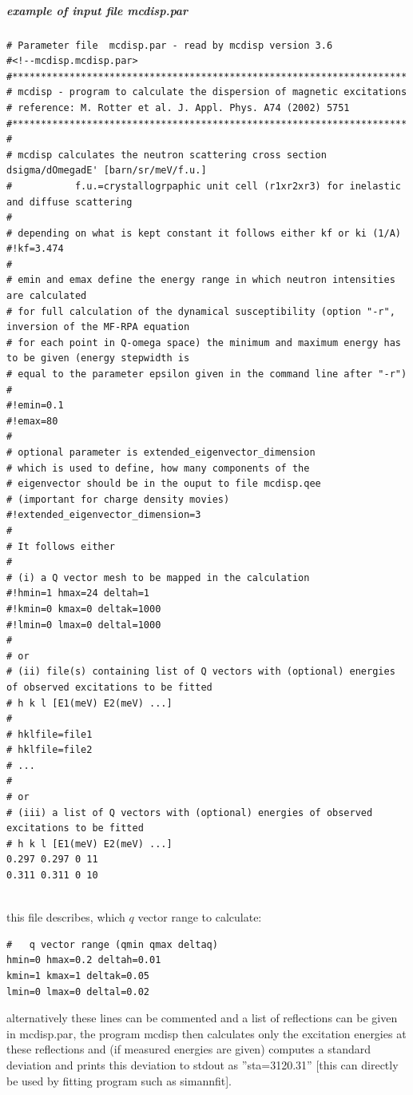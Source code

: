 \subparagraph{example of input file {\prg mcdisp.par}}

{\footnotesize
\begin{verbatim}
# Parameter file  mcdisp.par - read by mcdisp version 3.6
#<!--mcdisp.mcdisp.par>
#*********************************************************************
# mcdisp - program to calculate the dispersion of magnetic excitations
# reference: M. Rotter et al. J. Appl. Phys. A74 (2002) 5751
#*********************************************************************
#
# mcdisp calculates the neutron scattering cross section dsigma/dOmegadE' [barn/sr/meV/f.u.]
#           f.u.=crystallogrpaphic unit cell (r1xr2xr3) for inelastic and diffuse scattering
#
# depending on what is kept constant it follows either kf or ki (1/A)
#!kf=3.474
# 
# emin and emax define the energy range in which neutron intensities are calculated
# for full calculation of the dynamical susceptibility (option "-r", inversion of the MF-RPA equation 
# for each point in Q-omega space) the minimum and maximum energy has to be given (energy stepwidth is 
# equal to the parameter epsilon given in the command line after "-r")
#
#!emin=0.1
#!emax=80
#
# optional parameter is extended_eigenvector_dimension
# which is used to define, how many components of the
# eigenvector should be in the ouput to file mcdisp.qee
# (important for charge density movies)
#!extended_eigenvector_dimension=3
#
# It follows either 
#
# (i) a Q vector mesh to be mapped in the calculation
#!hmin=1 hmax=24 deltah=1
#!kmin=0 kmax=0 deltak=1000
#!lmin=0 lmax=0 deltal=1000
#
# or 
# (ii) file(s) containing list of Q vectors with (optional) energies of observed excitations to be fitted
# h k l [E1(meV) E2(meV) ...]
#
# hklfile=file1
# hklfile=file2
# ...
#
# or
# (iii) a list of Q vectors with (optional) energies of observed excitations to be fitted
# h k l [E1(meV) E2(meV) ...]
0.297 0.297 0 11 
0.311 0.311 0 10 


\end{verbatim}
}

this file describes, which $q$ vector range to
calculate:

\begin{verbatim}
#   q vector range (qmin qmax deltaq)
hmin=0 hmax=0.2 deltah=0.01
kmin=1 kmax=1 deltak=0.05
lmin=0 lmax=0 deltal=0.02
\end{verbatim}

alternatively these lines can be commented and a
list of reflections can be given in {\prg mcdisp.par}, the
program {\prg mcdisp} then calculates only 
the excitation energies at these reflections and (if measured
energies are given) computes a standard deviation
and prints
this deviation to stdout as ''sta=3120.31'' [this can directly
be used by fitting program such as {\prg simannfit}].

